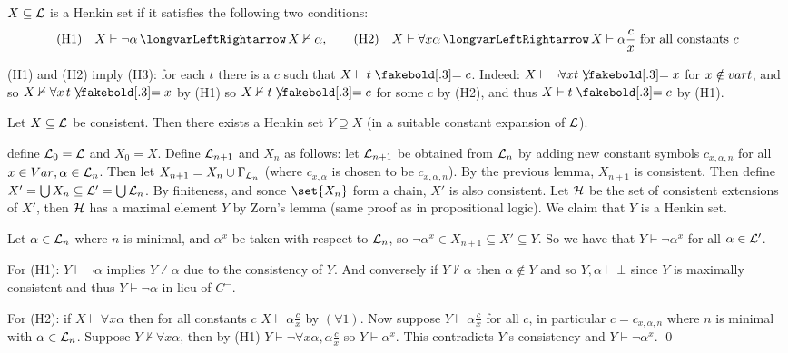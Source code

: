 \bdefn

    $X\subseteq{\cal L}$ is a {\emphcolor Henkin set} if it satisfies the following two conditions:
    $$ ({\rm H1})\quad X\vdash\neg\alpha \iff X\nvdash\alpha,\qquad
    ({\rm H2})\quad X\vdash\forall x\alpha\iff X\vdash\alpha\frac cx\hbox{ for all constants $c$} $$

\edefn

(H1) and (H2) imply (H3): for each $t$ there is a $c$ such that $X\vdash t\eq c$.
Indeed: $X\vdash\neg\forall x t\neqb x$ for $x\notin{\sl var} t$, and so $X\nvdash\forall x\,t\neqb x$ by (H1) so $X\nvdash t\neqb c$
for some $c$ by (H2), and thus $X\vdash t\eq c$ by (H1).

\blemm

    Let $X\subseteq{\cal L}$ be consistent.
    Then there exists a Henkin set $Y\supseteq X$ (in a suitable constant expansion of ${\cal L}$).

\elemm

\Proof define ${\cal L}_0={\cal L}$ and $X_0=X$.
Define ${\cal L}_{n+1}$ and $X_n$ as follows: let ${\cal L}_{n+1}$ be obtained from ${\cal L}_n$ by adding new constant symbols $c_{x,\alpha,n}$
for all $x\in{\sl Var},\alpha\in{\cal L}_n$.
Then let $X_{n+1}=X_n\cup\Gamma_{{\cal L}_n}$ (where $c_{x,\alpha}$ is chosen to be $c_{x,\alpha,n}$).
By the previous lemma, $X_{n+1}$ is consistent.
Then define $X'=\bigcup X_n\subseteq{\cal L}'=\bigcup{\cal L}_n$.
By finiteness, and sonce $\set{X_n}$ form a chain, $X'$ is also consistent.
Let ${\cal H}$ be the set of consistent extensions of $X'$, then ${\cal H}$ has a maximal element $Y$ by Zorn's lemma (same proof as in
propositional logic).
We claim that $Y$ is a Henkin set.

Let $\alpha\in{\cal L}_n$ where $n$ is minimal, and $\alpha^x$ be taken with respect to ${\cal L}_n$, so
$\neg\alpha^x\in X_{n+1}\subseteq X'\subseteq Y$.
So we have that $Y\vdash\neg\alpha^x$ for all $\alpha\in{\cal L}'$.

For (H1): $Y\vdash\neg\alpha$ implies $Y\nvdash\alpha$ due to the consistency of $Y$.
And conversely if $Y\nvdash\alpha$ then $\alpha\notin Y$ and so $Y,\alpha\vdash\bot$ since $Y$ is maximally consistent and thus
$Y\vdash\neg\alpha$ in lieu of $C^-$.

For (H2): if $X\vdash\forall x\alpha$ then for all constants $c$ $X\vdash\alpha\frac cx$ by $(\forall1)$.
Now suppose $Y\vdash\alpha\frac cx$ for all $c$, in particular $c=c_{x,\alpha,n}$ where $n$ is minimal with $\alpha\in{\cal L}_n$.
Suppose $Y\nvdash\forall x\alpha$, then by (H1) $Y\vdash\neg\forall x\alpha,\alpha\frac cx$ so $Y\vdash\alpha^x$.
This contradicts $Y$'s consistency and $Y\vdash\neg\alpha^x$.
\qed

